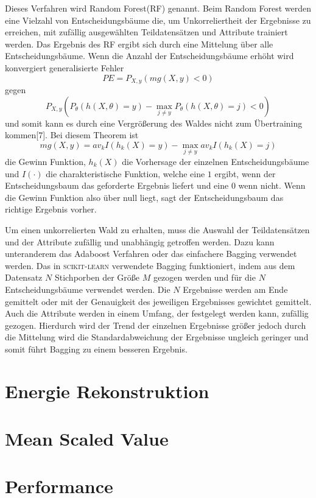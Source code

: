 Dieses Verfahren wird Random Forest(RF) genannt. Beim Random Forest werden eine Vielzahl von Entscheidungsbäume die, um Unkorreliertheit der Ergebnisse zu erreichen, mit
zufällig ausgewählten Teildatensätzen und Attribute trainiert werden. Das Ergebnis des RF ergibt sich durch eine Mittelung über alle Entscheidungsbäume.
Wenn die Anzahl der Entscheidungsbäume erhöht wird konvergiert generalisierte Fehler
\begin{equation}
  PE = P_{X,y}(mg(X,y)<0)
\end{equation}
gegen
\begin{equation}
  P_{X,y}(P_\theta(h(X,\theta)=y)-\max_{j\neq y}P_\theta(h(X,\theta)=j)<0)
\end{equation}
und somit kann es durch eine Vergrößerung des Waldes nicht zum Übertraining kommen[7]\cite{RandomForests_Breiman}. Bei diesem Theorem ist
\begin{equation}
  mg(X,y) = av_k I(h_k(X)=y) - \max_{j \neq y}av_k I(h_k(X)=j)
\end{equation}
die Gewinn Funktion, $h_k(X)$ die Vorhersage der einzelnen Entscheidungsbäume und $I(\cdot)$ die charakteristische Funktion, welche eine $1$ ergibt, wenn der
Entscheidungsbaum das geforderte Ergebnis liefert und eine $0$ wenn nicht. Wenn die Gewinn Funktion also über null liegt, sagt der Entscheidungsbaum das richtige Ergebnis vorher.

Um einen unkorrelierten Wald zu erhalten, muss die Auswahl der Teildatensätzen und der Attribute zufällig und unabhängig getroffen werden. Dazu kann unteranderem das Adaboost
Verfahren oder das einfachere Bagging verwendet werden. Das in \textsc{scikit-learn} verwendete Bagging funktioniert, indem aus dem Datensatz $N$ Stichporben der Größe
$M$ gezogen werden und für die $N$ Entscheidungsbäume verwendet werden. Die $N$ Ergebnisse werden am Ende gemittelt oder mit der Genauigkeit des jeweiligen Ergebnisses gewichtet
gemittelt. Auch die Attribute werden in einem Umfang, der festgelegt werden kann, zufällig gezogen. Hierdurch wird der Trend der einzelnen Ergebnisse größer jedoch durch die
Mittelung wird die Standardabweichung der Ergebnisse ungleich geringer und somit führt Bagging zu einem besseren Ergebnis.


\section{Energie Rekonstruktion}

\section{Mean Scaled Value}


\section{Performance}
